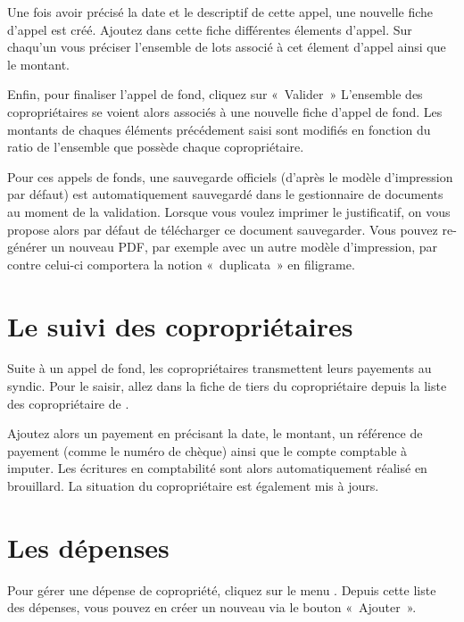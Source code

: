 \documentclass[a4paper,10pt,oneside,french]{sphinxmanual}
\begin{document}
Une fois avoir précisé la date et le descriptif de cette appel, une nouvelle fiche d’appel est créé.
Ajoutez dans cette fiche différentes élements d’appel.
Sur chaqu’un vous préciser l’ensemble de lots associé à cet élement d’appel ainsi que le montant.
\begin{quote}

\noindent{}
\end{quote}

Enfin, pour finaliser l’appel de fond, cliquez sur « Valider »
L’ensemble des copropriétaires se voient alors associés à une nouvelle fiche d’appel de fond.
Les montants de chaques éléments précédement saisi sont modifiés en fonction du ratio de l’ensemble que possède chaque copropriétaire.

Pour ces appels de fonds, une sauvegarde officiels (d’après le modèle d’impression par défaut) est automatiquement sauvegardé dans le gestionnaire de documents au moment de la validation.
Lorsque vous voulez imprimer le justificatif, on vous propose alors par défaut de télécharger ce document sauvegarder.
Vous pouvez re-générer un nouveau PDF, par exemple avec un autre modèle d’impression, par contre celui-ci comportera la notion « duplicata » en filigrame.


\section{Le suivi des copropriétaires}
\label{\detokenize{condominium/payoff:le-suivi-des-coproprietaires}}\label{\detokenize{condominium/payoff::doc}}
Suite à un appel de fond, les copropriétaires transmettent leurs payements au syndic.
Pour le saisir, allez dans la fiche de tiers du copropriétaire depuis la liste des copropriétaire de .
\begin{quote}

\noindent{}
\end{quote}

Ajoutez alors un payement en précisant la date, le montant, un référence de payement (comme le numéro de chèque) ainsi que le compte comptable à imputer.
Les écritures en comptabilité sont alors automatiquement réalisé en brouillard.
La situation du copropriétaire est également mis à jours.


\section{Les dépenses}
\label{\detokenize{condominium/expense:les-depenses}}\label{\detokenize{condominium/expense::doc}}
Pour gérer une dépense de copropriété, cliquez sur le menu .
Depuis cette liste des dépenses, vous pouvez en créer un nouveau via le bouton « Ajouter ».
\end{document}
